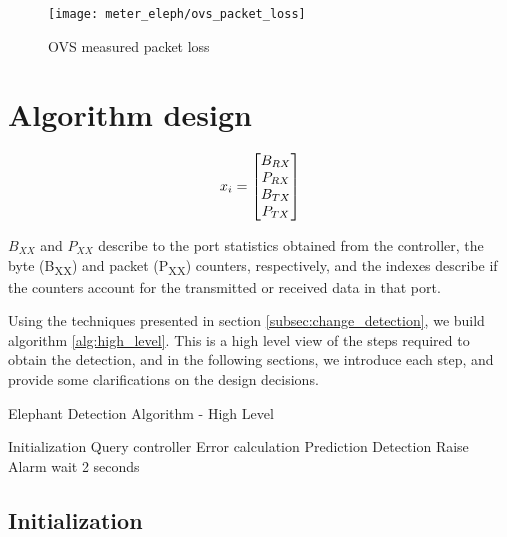 \begin{figure} 
    \centering
    \texttt{[image: meter\_eleph/ovs\_packet\_loss]}
    \caption {OVS measured packet loss}
    \label{fig:ovs_packet_loss}
\end{figure} 

\section {Algorithm design}

\begin {equation*}
\centering
x_i = 
\begin{bmatrix}
B_{RX}\\
P_{RX}\\
B_{TX}\\
P_{TX}\\
\end{bmatrix}
\end {equation*}

\par $B_{XX}$ and $P_{XX}$ describe to the port statistics obtained from the controller, the byte (B\textsubscript{XX}) and packet (P\textsubscript{XX}) counters, 
respectively, and the indexes describe if the counters account for the transmitted or received data in that port.

\par Using the techniques presented in section \ref{subsec:change_detection}, we build algorithm \ref{alg:high_level}. This is a high level view of the steps
required to obtain the detection, and in the following sections, we introduce each step, and provide some clarifications on the design decisions.

\begin{algorithm}[H]
    \caption{Elephant Detection Algorithm - High Level} \label{alg:high_level}
    \begin{algorithmic}[1]
            \State Initialization
            \State Query controller
            \Loop
                \State Error calculation
                \State Prediction
                \State Detection
                    \State Raise Alarm
                \EndIf
                \State wait 2 seconds
            \EndLoop
        \EndProcedure 
       \end{algorithmic}
\end{algorithm}

\subsection{Initialization}

